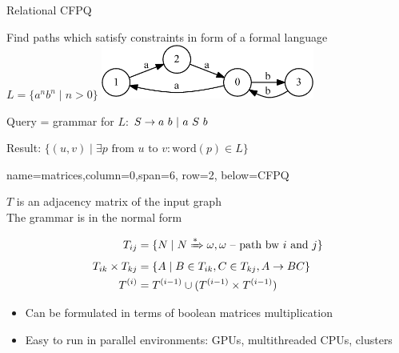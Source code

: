 \documentclass[a0paper,portrait]{baposter}
\begin{document}
\begin{poster}
\begin{posterbox}[name=CFPQ,column=0,row=0, span=4]{Relational CFPQ}

  Find paths which satisfy constraints in form of a formal language $L=\{a^n b^n \mid n > 0\}$
    \includegraphics[width=7cm]{example_graph_transparent.png}

    Query = grammar for $L$: $S  \rightarrow a  \ b \ | \ a \ S \ b  \\$

  Result: $ \{(u,v) \mid \exists p \text{ from } u \text{ to } v: \text{word}(p) \in L\} $

\end{posterbox}

{name=matrices,column=0,span=6, row=2, below=CFPQ}%
{

$T$ is an adjacency matrix of the input graph\\
The grammar is in the normal form
\vspace{-0.5cm}

\begin{align*}
T_{ij} &=\{ N \mid N \xRightarrow[]{*} \omega,  \omega \text{ -- path bw } i \text{ and } j \} \\
T_{ik} \times T_{kj} &= \{ A \mid B \in T_{ik}, C \in T_{kj}, A \rightarrow B C \} \\
T^{(i)} &= T^{(i-1)} \cup (T^{(i-1)} \times T^{(i-1)})
\end{align*}

\begin{itemize}
  \item Can be formulated in terms of boolean matrices multiplication
  \item Easy to run in parallel environments: GPUs, multithreaded CPUs, clusters
\end{itemize}
\vspace{0.1cm}
}



\end{poster}
\end{document}
